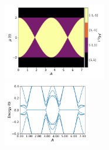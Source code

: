 \documentclass[xcolor=dvipsnames,10pt,aspectratio=169]{beamer}
\begin{document}
\begin{frame}
\begin{multicols}{2}
      \begin{figure}
        \includegraphics[width=0.4\textwidth]{./figures/topological-phase-diagram-1pi3-w-1.pdf} \\
        \hspace{-10mm}
        \pause
        \includegraphics[width=0.34\textwidth]{./figures/spectral-flow-nr-50-w-1-mu-1_6.pdf}
      \end{figure}
    \end{multicols}

  \end{frame}
\end{document}
